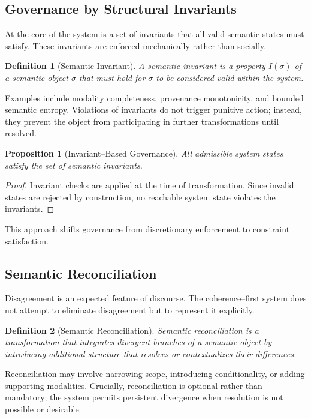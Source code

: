 \documentclass[11pt]{article}
\newtheorem{definition}{Definition}
\newtheorem{proposition}{Proposition}
\begin{document}
\subsection{Governance by Structural Invariants}

At the core of the system is a set of invariants that all valid semantic states must
satisfy. These invariants are enforced mechanically rather than socially.

\begin{definition}[Semantic Invariant]
A semantic invariant is a property $I(\sigma)$ of a semantic object $\sigma$ that must
hold for $\sigma$ to be considered valid within the system.
\end{definition}

Examples include modality completeness, provenance monotonicity, and bounded semantic
entropy. Violations of invariants do not trigger punitive action; instead, they prevent
the object from participating in further transformations until resolved.

\begin{proposition}[Invariant--Based Governance]
All admissible system states satisfy the set of semantic invariants.
\end{proposition}

\begin{proof}
Invariant checks are applied at the time of transformation. Since invalid states are
rejected by construction, no reachable system state violates the invariants.
\end{proof}

This approach shifts governance from discretionary enforcement to constraint satisfaction.

\subsection{Semantic Reconciliation}

Disagreement is an expected feature of discourse. The coherence--first system does not
attempt to eliminate disagreement but to represent it explicitly.

\begin{definition}[Semantic Reconciliation]
Semantic reconciliation is a transformation that integrates divergent branches of a
semantic object by introducing additional structure that resolves or contextualizes their
differences.
\end{definition}

Reconciliation may involve narrowing scope, introducing conditionality, or adding
supporting modalities. Crucially, reconciliation is optional rather than mandatory; the
system permits persistent divergence when resolution is not possible or desirable.
\end{document}
